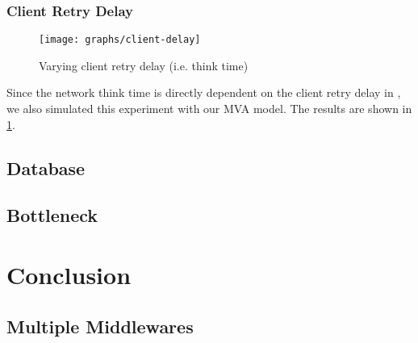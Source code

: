 \documentclass[a4paper, oneside]{csthesis}
\begin{document}
    \newpage
    
\subsection{Client Retry Delay}
    
    
    \begin{figure}[th]
        \centering
            \texttt{[image: graphs/client-delay]}
            \caption{Varying client retry delay (i.e. think time)}
            \label{fig:retry-delay}
    \end{figure}

    Since the network think time is directly dependent on the client retry delay
    in \telesto, we also simulated this experiment with our MVA model. The
    results are shown in \cref{fig:retry-delay}.
    
    \newpage

\section{Database}

\section{Bottleneck}



\chapter{Conclusion}
	
\section{Multiple Middlewares}






	
\end{document}
